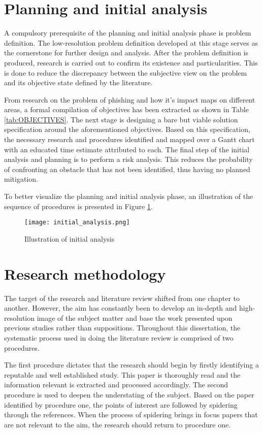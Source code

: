 \section{Planning and initial analysis}
A compulsory prerequisite of the planning and initial analysis phase is problem definition. The low-resolution problem definition developed at this stage serves as the cornerstone for further design and analysis. After the problem definition is produced, research is carried out to confirm its existence and particularities. This is done to reduce the discrepancy between the subjective view on the problem and its objective state defined by the literature.

From research on the problem of phishing and how it's impact maps on different areas, a formal compilation of objectives has been extracted as shown in Table \ref{tab:OBJECTIVES}. The next stage is designing a bare but viable solution specification around the aforementioned objectives. Based on this specification, the necessary research and procedures identified and mapped over a Gantt chart with an educated time estimate attributed to each. The final step of the initial analysis and planning is to perform a risk analysis. This reduces the probability of confronting an obstacle that has not been identified, thus having no planned mitigation.

To better visualize the planning and initial analysis phase, an illustration of the sequence of procedures is presented in Figure \ref{fig:INITIAL_ANALYSIS}.

\begin{figure}
	\centering
	\texttt{[image: initial\_analysis.png]}
	\caption{Illustration of initial analysis}
	\label{fig:INITIAL_ANALYSIS}
\end{figure}

\section{Research methodology}
The target of the research and literature review shifted from one chapter to another. However, the aim has constantly been to develop an in-depth and high-resolution image of the subject matter and base the work presented upon previous studies rather than suppositions. Throughout this dissertation, the systematic process used in doing the literature review is comprised of two procedures.

The first procedure dictates that the research should begin by firstly identifying a reputable and well established study. This paper is thoroughly read and the information relevant is extracted and processed accordingly.
The second procedure is used to deepen the understating of the subject. Based on the paper identified by procedure one, the points of interest are followed by spidering through the references. When the process of spidering brings in focus papers that are not relevant to the aim, the research should return to procedure one.

